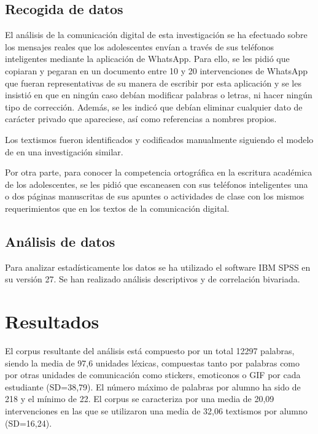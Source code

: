 \documentclass[spanish]{textolivre}
\begin{document}
\subsection{Recogida de datos}

El análisis de la comunicación digital de esta investigación se ha efectuado sobre los mensajes reales que los adolescentes envían a través de sus teléfonos inteligentes mediante la aplicación de WhatsApp. Para ello, se les pidió que copiaran y pegaran en un documento entre 10 y 20 intervenciones de WhatsApp que fueran representativas de su manera de escribir por esta aplicación y se les insistió en que en ningún caso debían modificar palabras o letras, ni hacer ningún tipo de corrección. Además, se les indicó que debían eliminar cualquier dato de carácter privado que apareciese, así como referencias a nombres propios. 

Los textismos fueron identificados y codificados manualmente siguiendo el modelo de \textcite[p. 119]{verheijen_orthographic_2018} en una investigación similar.

Por otra parte, para conocer la competencia ortográfica en la escritura académica de los adolescentes, se les pidió que escaneasen con sus teléfonos inteligentes una o dos páginas manuscritas de sus apuntes o actividades de clase con los mismos requerimientos que en los textos de la comunicación digital.  



\subsection{Análisis de datos}

Para analizar estadísticamente los datos se ha utilizado el software IBM SPSS en su versión 27. Se han realizado análisis descriptivos y de correlación bivariada.


\section{Resultados}

El corpus resultante del análisis está compuesto por un total 12297 palabras, siendo la media de 97,6 unidades léxicas, compuestas tanto por palabras como por otras unidades de comunicación como stickers, emoticonos o GIF por cada estudiante (SD=38,79). El número máximo de palabras por alumno ha sido de 218 y el mínimo de 22. El corpus se caracteriza por una media de 20,09 intervenciones en las que se utilizaron una media de 32,06 textismos por alumno (SD=16,24).
\end{document}
